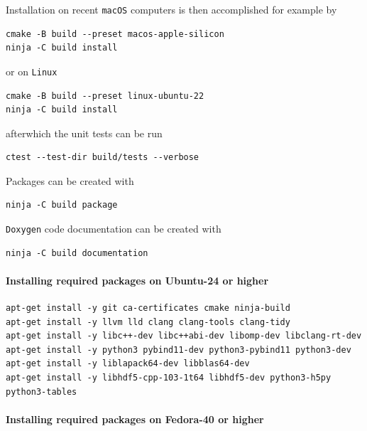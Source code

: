 \noindent
Installation on recent \texttt{macOS} computers is then accomplished for example by
\begin{framed}
\begin{verbatim}
cmake -B build --preset macos-apple-silicon
ninja -C build install
\end{verbatim}
\end{framed}
or on \texttt{Linux}
\begin{framed}
\begin{verbatim}
cmake -B build --preset linux-ubuntu-22
ninja -C build install
\end{verbatim}
\end{framed}
afterwhich the unit tests can be run
\begin{framed}
\begin{verbatim}
ctest --test-dir build/tests --verbose
\end{verbatim}
\end{framed}

\noindent
Packages can be created with
\begin{framed}
\begin{verbatim}
ninja -C build package
\end{verbatim}
\end{framed}

\noindent
\texttt{Doxygen} code documentation can be created with
\begin{framed}
\begin{verbatim}
ninja -C build documentation
\end{verbatim}
\end{framed}

\paragraph{Installing required packages on Ubuntu-24 or higher}

\begin{verbatim}
apt-get install -y git ca-certificates cmake ninja-build
apt-get install -y llvm lld clang clang-tools clang-tidy
apt-get install -y libc++-dev libc++abi-dev libomp-dev libclang-rt-dev
apt-get install -y python3 pybind11-dev python3-pybind11 python3-dev
apt-get install -y liblapack64-dev libblas64-dev
apt-get install -y libhdf5-cpp-103-1t64 libhdf5-dev python3-h5py python3-tables
\end{verbatim}

\paragraph{Installing required packages on Fedora-40 or higher}

